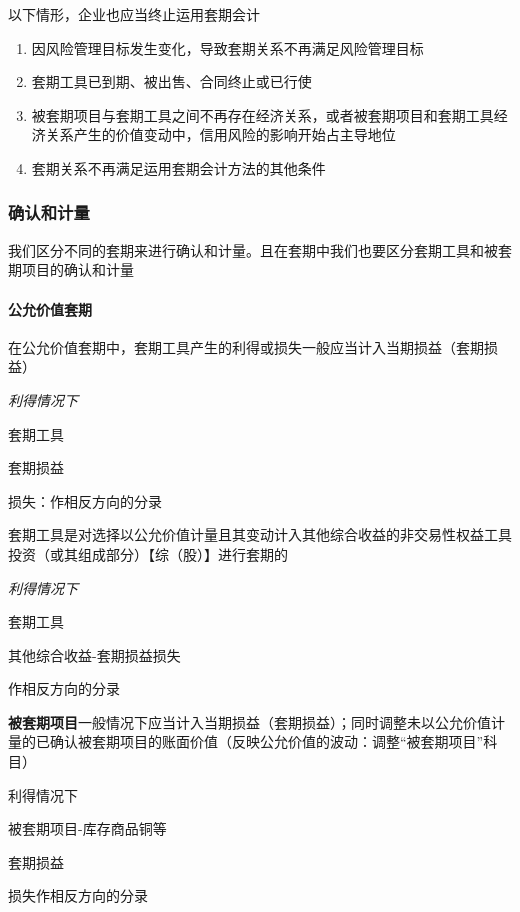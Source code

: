 \documentclass[UTF8,12pt]{ctexart}
\newenvironment{Dr}{%
	\begin{list}{}%
		{
			\setlength{\leftmargin}{2em}
			\setlength{\labelwidth}{2em}
			\setlength{\labelsep}{0pt}
			\setlength{\itemindent}{0pt}
			\setlength{\listparindent}{0pt}
			\setlength{\parsep}{0pt}
			\setlength{\topsep}{0pt}
		}
		\item[\textbf{借：}]
	}{%
	\end{list}
}
\newenvironment{Cr}{%
	\begin{list}{}%
		{
			\setlength{\leftmargin}{2em}
			\setlength{\labelwidth}{2em}
			\setlength{\labelsep}{0pt}
			\setlength{\itemindent}{0pt}
			\setlength{\listparindent}{0pt}
			\setlength{\parsep}{0pt}
			\setlength{\topsep}{0pt}
		}
		\item[\textbf{贷：}]
	}{%
	\end{list}
}
\numberwithin{equation}{section} %
\numberwithin{figure}{section}
\numberwithin{table}{section}
\begin{document}
	以下情形，企业也应当终止运用套期会计
	\begin{enumerate}
		\item 因风险管理目标发生变化，导致套期关系不再满足风险管理目标
		
		\item 套期工具已到期、被出售、合同终止或已行使
		
		\item 被套期项目与套期工具之间不再存在经济关系，或者被套期项目和套期工具经济关系产生的价值变动中，信用风险的影响开始占主导地位
		
		\item 套期关系不再满足运用套期会计方法的其他条件
	\end{enumerate}
	
	\subsubsection{确认和计量}
	我们区分不同的套期来进行确认和计量。且在套期中我们也要区分套期工具和被套期项目的确认和计量
	
	\paragraph{公允价值套期}
	
	在公允价值套期中，套期工具产生的利得或损失一般应当计入当期损益（套期损益）

	\textit{利得情况下}
	
	\begin{Dr}
		套期工具
	\end{Dr}
	\begin{Cr}
		套期损益
	\end{Cr}
	损失：作相反方向的分录
	
	套期工具是对选择以公允价值计量且其变动计入其他综合收益的非交易性权益工具投资（或其组成部分）【综（股）】进行套期的
	
	\textit{利得情况下}
	
	\begin{Dr}
		套期工具
	\end{Dr}
	\begin{Cr}
		其他综合收益-套期损益损失
	\end{Cr}
	作相反方向的分录
	
	\textbf{被套期项目}一般情况下应当计入当期损益（套期损益）；同时调整未以公允价值计量的已确认被套期项目的账面价值（反映公允价值的波动：调整“被套期项目”科目）
	
	利得情况下
	
	\begin{Dr}
		被套期项目-库存商品铜等
	\end{Dr}
	\begin{Cr}
		套期损益
	\end{Cr}
	损失作相反方向的分录
	
\end{document}

